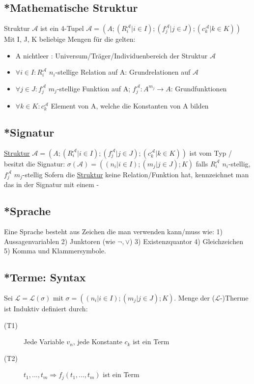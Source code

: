 \documentclass[12pt,a4paper]{article} %
\begin{document}
	\subsection{*Mathematische Struktur}
	\label{Struktur}
	Struktur $\mathcal{A}$ ist ein 4-Tupel $\mathcal{A} = (A; (R_i^{\mathcal{A}} | i \in I); (f_j^{\mathcal{A}} | j \in J); (c_k^{\mathcal{A}} | k \in K))$ \newline 
	Mit I, J, K beliebige Mengen für die gelten:
	\begin{itemize}
		\item A nichtleer : Universum/Träger/Individuenbereich der Struktur $\mathcal{A}$
		\item $\forall i \in I: R_i^{\mathcal{A}}$ $n_i$-stellige Relation auf A: Grundrelationen auf $\mathcal{A}$
		\item $\forall j \in J: f_j^{\mathcal{A}}$ $m_j$-stellige Funktion auf A; $f_j^{\mathcal{A}}: A^{m_j} \rightarrow A$: Grundfunktionen 
		\item $\forall k \in K: c_k^{\mathcal{A}}$ Element von A, welche die Konstanten von A bilden
	\end{itemize}

	\subsection{*Signatur}
	\label{Signatur}
	\hyperref[Struktur]{Struktur} $\mathcal{A} = (A; (R_i^{\mathcal{A}} | i \in I); (f_j^{\mathcal{A}} | j \in J); (c_k^{\mathcal{A}} | k \in K))$ ist vom Typ / besitzt die Signatur: $\sigma (\mathcal{A}) = ((n_i | i \in I); (m_j | j \in J); K)$ \newline
	falls $R_i^{\mathcal{A}}$ $n_i$-stellig, $f_j^{\mathcal{A}}$ $m_j$-stellig\newline 
	Sofern die \hyperref[Struktur]{Struktur} keine Relation/Funktion hat, kennzeichnet man das in der Signatur mit einem -
	
	\subsection{*Sprache}
	\label{PLSprache}
	Eine Sprache besteht aus Zeichen die man verwenden kann/muss wie: 1)
	Aussagenvariablen 2) Junktoren (wie $\neg, \lor$) 3) Existenzquantor 4) Gleichzeichen 5) Komma und Klammersymbole.
	
	\subsection{*Terme: Syntax}
	Sei $\mathcal{L} = \mathcal{L}(\sigma)$ mit $\sigma = ((n_i | i \in I); (m_j | j \in J); K)$. Menge der ($\mathcal{L}$-)Therme ist Induktiv definiert durch:
	\begin{description}
		\item[(T1)] Jede Variable $v_n$, jede Konstante $c_k$ ist ein Term
		\item[(T2)] $t_1, ..., t_m \Rightarrow f_j(t_1, ..., t_m)$ ist ein Term
	\end{description}
	
\end{document}

